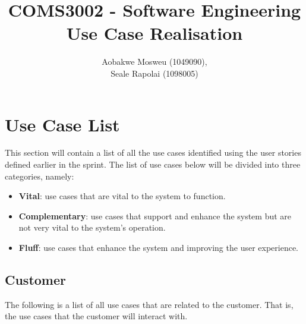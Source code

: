 \documentclass[11pt]{article}
\begin{document}
	\title{%
		COMS3002 - Software Engineering\\
		\large Use Case Realisation
	}
	\author{Aobakwe Mosweu (1049090), \\Seale Rapolai (1098005)}
	\maketitle
	
	\clearpage
	\tableofcontents
	\clearpage
	
	\section{Use Case List}
	\begin{flushleft}
		This section will contain a list of all the use cases identified using the user stories defined earlier in the sprint. The list of use cases below will be divided into three categories, namely:
	\end{flushleft}
	\begin{itemize}
		\item \textbf{Vital}: use cases that are vital to the system to function.
		\item \textbf{Complementary}: use cases that support and enhance the system but are not very vital to the system's operation.
		\item \textbf{Fluff}: use cases that enhance the system and improving the user experience.
	\end{itemize}
	
		\subsection{Customer}
		\begin{flushleft}
			The following is a list of all use cases that are related to the customer. That is, the use cases that the customer will interact with.
		\end{flushleft}
	
\end{document}
